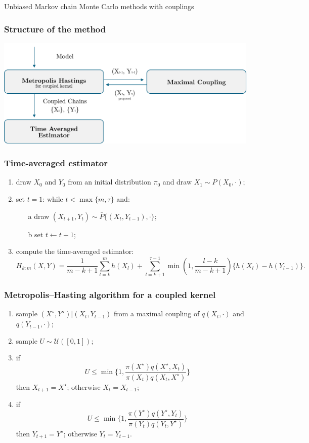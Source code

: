 \documentclass{beamer}
\begin{document}
\begin{section}{Unbiased Markov chain Monte Carlo methods with couplings}
	\begin{frame}[plain]{}
		\sectionpage
	\end{frame}

	\begin{frame}
		\frametitle{Structure of the method}
		\begin{center}
			\includegraphics[width=0.95\textwidth]{img/Bayes1}
		\end{center}
	\end{frame}
	
	\begin{frame}
		\frametitle{Time-averaged estimator}
		\begin{enumerate}
			\item draw $X_0$ and $Y_0$ from an initial distribution $\pi_0$ and draw $X_1 \sim P(X_0, \cdot)$;
			\item set $t=1$: while $t<\max\{m,\tau\}$ and:
			\begin{itemize}
				\item[a] draw $(X_{t+1}, Y_t)\sim \bar P \{(X_t, Y_{t-1}), \cdot \}$; 
				\item[b] set $t \leftarrow t+1$;
			\end{itemize}
			\item compute the time-averaged estimator:
			\footnotesize{	 	$$
				H_{k:m}(X,Y)
				= \frac{1}{m-k+1}\sum_{l=k}^{m}h(X_l) 
				+ \sum_{l=k+1}^{\tau -1}\min(1, \frac{l-k}{m-k+1})\{h(X_l)-h(Y_{l-1})\} .
				$$
			}
		\end{enumerate}
	\end{frame}
	
	\begin{frame} 	
		\frametitle{Metropolis--Hasting algorithm for a coupled kernel}
			\begin{enumerate}
				\item sample $(X^\star, Y^\star) | (X_t, Y_{t-1})$ from a maximal coupling of $q(X_t, \cdot)$ and $q(Y_{t-1}, \cdot)$;
				\item sample $U \sim \mathcal{U}([0,1])$;
				\item if
				$$ U
				\leq \min\bigg \{
				1,
				\frac{ \pi(X^\star)q(X^\star,X_t)}{
					\pi(X_t)q(X_t, X^\star)}
				\bigg \}
				$$
				then $X_{t+1} = X^\star$; otherwise $X_t = X_{t-1}$;
				\item if
				$$ U
				\leq \min\bigg \{ 
				1,
				\frac{ \pi(Y^\star)q(Y^\star,Y_t)}{
					\pi(Y_t)q(Y_t, Y^\star)}
				\bigg \}
				$$
				then $Y_{t+1} = Y^\star$; otherwise $Y_t = Y_{t-1}$.
				

\end{enumerate}
\end{frame}
\end{section}
\end{document}
